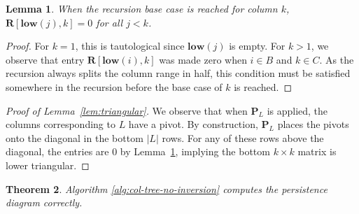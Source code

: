 \documentclass[10pt,a4paper]{article}
\newtheorem{theorem}{Theorem}[section]
\newtheorem{lemma}[theorem]{Lemma}
\newcommand{\mat}[1]{\mathbf{#1}}
\newcommand{\low}{\mathbf{low}}
\newcommand{\Remark}[1]{\textcolor{blue}{[#1]}}
\begin{document}
\begin{lemma}\label{lem:recurse}
When the recursion base case is reached for column $k$, $\mat{R}[\low(j),k]=0$ for all $j<k$.
\end{lemma}
\begin{proof}
For $k=1$, this is tautological since $\low  (j)$ is empty. For $k>1$, we observe that entry $\mat{R}[\low  (i),k]$ was made zero when $i\in B$ and $k\in C$. As the recursion always splits the column range in half, this condition must be satisfied somewhere in the recursion before the base case of $k$ is reached.
\end{proof}

\begin{proof}[Proof of Lemma~\ref{lem:triangular}]
    We observe that when $\mat{P}_L$ is applied, the columns corresponding to $L$ have a pivot.  By construction,  $\mat{P}_L$ places the pivots onto the diagonal in the bottom $|L|$ rows. For any of these rows above the diagonal, the entries are 0 by Lemma~\ref{lem:recurse}, implying the bottom $k\times k$ matrix is lower triangular. 
\end{proof}

\begin{theorem}
Algorithm \ref{alg:col-tree-no-inversion} computes the persistence diagram correctly.
\end{theorem}
\end{document}
